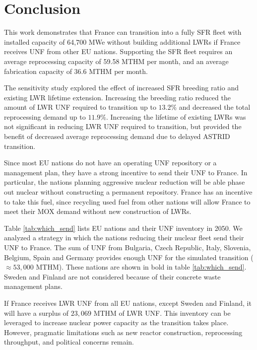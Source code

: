 \section{Conclusion}

This work demonstrates that France can transition into
a fully \gls{SFR} fleet with installed capacity of 64,700 \gls{MWe} without
building additional \glspl{LWR}
if France receives \gls{UNF} from other \gls{EU} nations.
Supporting the \gls{SFR} fleet requires an average 
reprocessing capacity of 59.58 \gls{MTHM} per month,
and an average fabrication capacity of 36.6 \gls{MTHM} per month.

The sensitivity study explored the effect of increased \gls{SFR} breeding
ratio and existing \gls{LWR} lifetime extension. Increasing the breeding
ratio reduced the amount of \gls{LWR} \gls{UNF} required to transition
up to $13.2\%$ and decreased the total reprocessing demand up to $11.9\%$.
Increasing the lifetime of existing \glspl{LWR} was not significant
in reducing \gls{LWR} \gls{UNF} required to transition, but provided the benefit of
decreased average reprocessing demand due to delayed \gls{ASTRID} transition.

Since most \gls{EU} nations do not have an operating \gls{UNF}
repository or a management plan, they have a strong incentive
to send their \gls{UNF} to France. In particular, the nations
planning aggressive nuclear reduction will be able phase out nuclear
without constructing a permanent repository. France has an
incentive to take this fuel, since recycling used fuel from
other nations will allow France to meet their MOX demand
without new construction of \glspl{LWR}.

Table \ref{tab:which_send} lists \gls{EU} nations and their \gls{UNF} inventory
in 2050. We analyzed a strategy in which 
the nations reducing their nuclear fleet send their \gls{UNF} to France.
The sum of \gls{UNF} from Bulgaria, Czech Republic, Italy, Slovenia, Belgium, Spain and Germany
provides enough \gls{UNF} for the simulated transition ($\approx 53,000$ MTHM). 
These nations are shown in bold in table \ref{tab:which_send}.
Sweden and Finland are not considered because of their concrete waste management plans.

If France receives \gls{LWR} \gls{UNF} from all \gls{EU} nations,
except Sweden and Finland,
it will have a surplus of $23,069$ MTHM of \gls{LWR} \gls{UNF}. This
inventory can be leveraged to increase nuclear power capacity as
the transition takes place. However, pragmatic limitations such
as new reactor construction, reprocessing throughput, and
political concerns remain.

